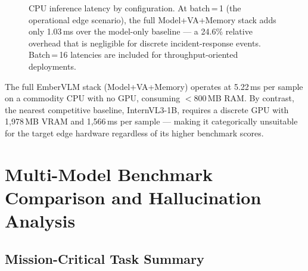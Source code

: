 \documentclass[runningheads]{llncs}
\begin{document}
\begin{figure}[ht]
\centering
{}
\caption{CPU inference latency by configuration. At batch\,=\,1 (the operational edge scenario), the full Model+VA+Memory stack adds only 1.03\,ms over the model-only baseline — a 24.6\% relative overhead that is negligible for discrete incident-response events. Batch\,=\,16 latencies are included for throughput-oriented deployments.}
\label{fig:latency-bar}
\end{figure}

The full EmberVLM stack (Model+VA+Memory) operates at 5.22\,ms per sample on a commodity CPU with no GPU, consuming $<$800\,MB RAM. By contrast, the nearest competitive baseline, InternVL3-1B, requires a discrete GPU with 1,978\,MB VRAM and 1,566\,ms per sample — making it categorically unsuitable for the target edge hardware regardless of its higher benchmark scores.

\section{Multi-Model Benchmark Comparison and Hallucination Analysis}
\label{sec:supp-baselines}

\subsection{Mission-Critical Task Summary}
\end{document}
